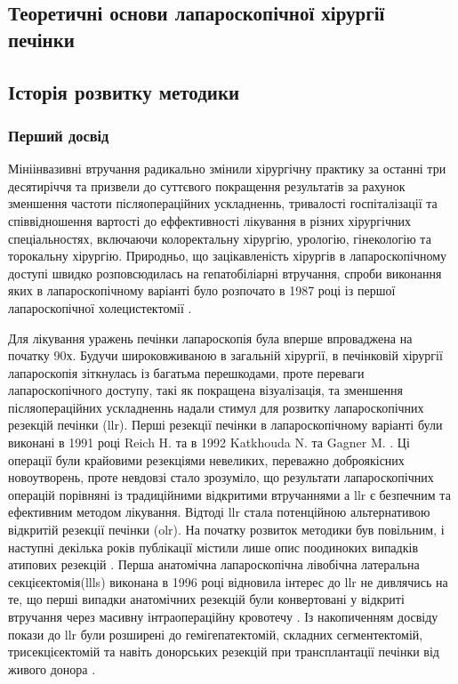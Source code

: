 \begin{refsection}
\chapter{Теоретичні основи лапароскопічної хірургії печінки}

\section{Історія розвитку методики}
\subsection{Перший досвід}
Мініінвазивні втручання радикально змінили хірургічну практику за останні три десятиріччя та призвели до суттєвого покращення результатів за рахунок зменшення частоти післяопераційних ускладненнь, тривалості госпіталізації та співвідношення вартості до еффективності лікування в різних хірургічних спеціальностях, включаючи колоректальну хірургію, урологію, гінекологію та торокальну хірургію. Природньо, що зацікавленість хірургів в лапароскопічному доступі швидко розповсюдилась на гепатобіліарні втручання, спроби виконання яких в лапароскопічному варіанті було розпочато в 1987 році із першої лапароскопічної холецистектомії \cite{Litynski}. 

Для лікування уражень печінки лапароскопія була вперше впроваджена на початку 90х. Будучи широковживаною в загальній хірургії, в печінковій хірургії лапароскопія зіткнулась із багатьма перешкодами, проте переваги лапароскопічного доступу, такі як покращена візуалізація, та зменшення післяопераційних ускладненнь  надали стимул для розвитку лапароскопічних резекцій печінки (\acrshort{llr}). Перші резекції печінки в лапароскопічному варіанті були виконані в 1991 році Reich H. \cite{Reich1991a} та  в 1992 Katkhouda N. \cite{Katkhouda1992} та Gagner M. \cite{GAGNER1992}. Ці операції були крайовими резекціями невеликих, переважно доброякісних новоутворень, проте невдовзі стало зрозуміло, що результати лапароскопічних операцій порівняні із традиційними відкритими втручаннями а \acrshort{llr} є безпечним та ефективним методом лікування. Відтоді \acrshort{llr} стала потенційною альтернативою відкритій резекції печінки (\acrshort{olr}). 
На початку розвиток методики був повільним, і наступні декілька років публікації містили лише опис поодиноких випадків атипових резекцій \cite{Klotz1993, Cunningham1995}. Перша анатомічна лапароскопічна лівобічна латеральна секцієектомія(\acrshort{llls}) виконана в 1996 році \cite{Azagra1996}  відновила інтерес до \acrshort{llr} не дивлячись на те, що перші випадки анатомічних резекцій були конвертовані у відкриті втручання через масивну інтраопераційну кровотечу \cite{Hashizume1995}.  Із накопиченням досвіду покази до \acrshort{llr} були розширені до гемігепатектомій, складних сегментектомій, трисекцієектомій та навіть донорських резекцій при трансплантації печінки від живого донора \cite{Dagher2009, Cherqui2002, Jia2018}. 


\end{refsection}

